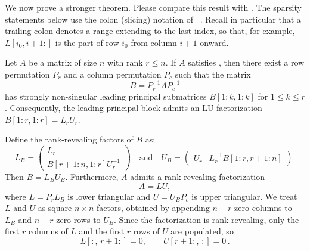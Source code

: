 \documentclass[final]{siamart1116}
\numberwithin{theorem}{section}
\begin{document}
We now prove a stronger theorem. Please compare this result with . The sparsity statements below use the colon (slicing) notation of ~\cite{golub_matrix_2013}. Recall in particular that a trailing colon denotes a range extending to the last index, so that, for example, $L[i_0, i+1:]$ is the part of row $i_0$ from column $i+1$ onward.

\begin{theorem}\label{thm:main2}
  Let $A$ be a matrix of size $n$ with rank $r \le n$. If $A$ satisfies , then there exist a row permutation $P_r$ and a column permutation $P_c$ such that the matrix
  \[ B = P_r^{-1} A P_c^{-1} \]
  has strongly non-singular leading principal submatrices $B[1:k,1:k]$ for $1 \le k \le r$. Consequently, the leading principal block admits an LU factorization $B[1:r,1:r] = L_r U_r$.

  Define the rank-revealing factors of $B$ as:
  \[
    L_B =
    \begin{pmatrix} L_r \\ B[r+1:n, 1:r] U_r^{-1}
    \end{pmatrix}
    \quad \text{and} \quad
    U_B =
    \begin{pmatrix} U_r & L_r^{-1} B[1:r, r+1:n]
    \end{pmatrix}.
  \]
  Then $B = L_B U_B$. Furthermore, $A$ admits a rank-revealing factorization
  \[ A = L U, \]
  where $L = P_r L_B$ is lower triangular and $U = U_B P_c$ is upper triangular. We treat $L$ and $U$ as square $n \times n$ factors, obtained by appending $n - r$ zero columns to $L_B$ and $n - r$ zero rows to $U_B$. Since the factorization is rank revealing, only the first $r$ columns of $L$ and the first $r$ rows of $U$ are populated, so
  \[ L[:,\, r+1:] = 0, \qquad U[r+1:,\, :] = 0 \,. \]


\end{theorem}
\end{document}
